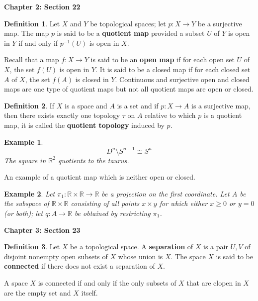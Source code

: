 \documentclass{article}
\newtheorem*{example}{Example}
\theoremstyle{definition}
\newtheorem{definition}{Definition}[section]
\theoremstyle{remark}
\begin{document}
    \newpage

    \textbf{Chapter 2: Section 22}
    \begin{definition}
        Let $X$ and $Y$ be topological spaces; let $p: X\to Y$ be a surjective map. The map $p$ is said to be a \textbf{quotient map}
        provided a subset $U$ of $Y$ is open in $Y$ if and only if $p^{-1}(U)$ is open in $X$.
    \end{definition}

    Recall that a map $f:X\to Y$ is said to be an \textbf{open map} if for each open set $U$ of $X$, the set $f(U)$ is open
    in $Y$. It is said to be a closed map if for each closed set $A$ of $X$, the set $f(A)$ is closed in $Y$. Continuous
    and surjective open and closed maps are one type of quotient maps but not all quotient maps are open or closed.

    \begin{definition}
        If $X$ is a space and $A$ is a set and if $p: X\to A$ is a surjective map, then there exists exactly one
        topology $\tau$ on $A$ relative to which $p$ is a quotient map, it is called the \textbf{quotient topology} induced by $p$.
    \end{definition}

    \begin{example}
        \[ D^n \setminus S^{n-1} \cong S^n \]
        The square in $\mathbb{R}^2$ quotients to the taurus.
    \end{example}

    An example of a quotient map which is neither open or closed.
    \begin{example}
        Let $\pi_1: \mathbb{R}\times\mathbb{R}\to\mathbb{R}$ be a projection on the first coordinate. Let $A$ be the subspace
        of $\mathbb{R}\times\mathbb{R}$ consisting of all points $x\times y$ for which either $x\geq 0$ or $y=0$ (or both); let
        $q: A\to\mathbb{R}$ be obtained by restricting $\pi_1$.
    \end{example}

    \newpage

    \textbf{Chapter 3: Section 23}
    \begin{definition}
        Let $X$ be a topological space. A \textbf{separation} of $X$ is a pair $U,V$ of disjoint nonempty open subsets of $X$ whose
        union is $X$. The space $X$ is said to be \textbf{connected} if there does not exist a separation of $X$.
    \end{definition}
    A space $X$ is connected if and only if the only subsets of $X$ that are clopen in $X$ are the empty set and $X$ itself.
    
\end{document}
